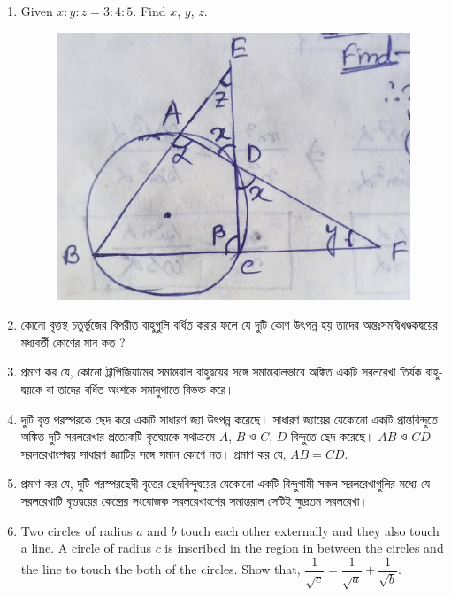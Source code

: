 \documentclass[11pt, a4paper]{article}
\begin{document}
\begin{enumerate}
	\item  Given $x:y:z = 3:4:5$. Find $x$, $y$, $z$.
	\begin{figure}[h]
	\centering
	\includegraphics[scale = 0.1]{IMG_20230723_153249_398}\\
	\end{figure}

	\item \textbengali{কোনো বৃত্তস্থ চতুর্ভুজের বিপরীত বাহুগুলি বর্ধিত করার ফলে যে দুটি কোণ উৎপন্ন হয় তাদের অন্তঃসমদ্বিখণ্ডকদ্বয়ের মধ্যবর্তী কোণের মান কত ?}

	\item \textbengali{প্রমাণ কর যে, কোনো ট্রাপিজিয়ামের সমান্তরাল বাহুদ্বয়ের সঙ্গে সমান্তরালভাবে অঙ্কিত একটি সরলরেখা তির্যক বাহুদ্বয়কে বা তাদের বর্ধিত অংশকে সমানুপাতে বিভক্ত করে।} 
	
	\item \textbengali{দুটি বৃত্ত পরস্পরকে ছেদ করে একটি সাধারণ জ্যা উৎপন্ন করেছে।  সাধারণ জ্যায়ের যেকোনো একটি প্রান্তবিন্দুতে অঙ্কিত দুটি সরলরেখার প্রত্যেকটি বৃত্তদ্বয়কে যথাক্রমে} $A$, $B$ \textbengali{ও} $C$, $D$ \textbengali{বিন্দুতে ছেদ করেছে।} $AB$ \textbengali{ও} $CD$ \textbengali{সরলরেখাংশদ্বয় সাধারণ জ্যাটির সঙ্গে সমান কোণে নত। প্রমাণ কর যে, }$AB = CD$.
	
	\item \textbengali{প্রমাণ কর যে, দুটি পরস্পরছেদী বৃত্তের ছেদবিন্দুদ্বয়ের যেকোনো একটি বিন্দুগামী সকল সরলরেখাগুলির মধ্যে যে সরলরেখাটি বৃত্তদ্বয়ের কেন্দ্রের সংযোজক সরলরেখাংশের সমান্তরাল সেটিই ক্ষুদ্রতম সরলরেখা।}
	
	\item Two circles of radius $a$ and $b$ touch each other externally and they also touch a line. A circle of radius $c$ is inscribed in the region in between the circles and the line to touch the both of the circles. Show that, $\dfrac{1}{\sqrt{c}} = \dfrac{1}{\sqrt{a}} + \dfrac{1}{\sqrt{b}}$.
	

\end{enumerate}
\end{document}
